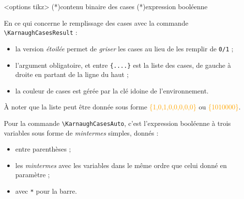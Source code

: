\documentclass[french,a4paper,11pt]{article}
\newcommand\Cle[1]{{\small\sffamily\textlangle \textcolor{orange}{#1}\textrangle}}
\begin{document}
{{\begin{DemoCode}
\begin{TableKarnaugh}[clés]<options tikz>
	\KarnaughCasesResult(*){contenu binaire des cases}
	\KarnaughCasesAuto(*){expression booléenne}
\end{TableKarnaugh}
\end{DemoCode}

\begin{tipblock}
En ce qui concerne le remplissage des cases avec la commande \texttt{\textbackslash KarnaughCasesResult} :

\begin{itemize}
	\item la version \textit{étoilée} permet de \textit{griser} les cases au lieu de les remplir de \texttt{0/1} ;
	\item l'argument obligatoire, et entre \texttt{\{....\}} est la liste des cases, de gauche à droite en partant de la ligne du haut ;
	\item la couleur de cases est gérée par la clé idoine de l'environnement.
\end{itemize}

À noter que la liste peut être donnée sous forme \Cle{\{1,0,1,0,0,0,0,0\}} ou \Cle{\{1010000\}}.
\end{tipblock}

\begin{tipblock}
Pour la commande \texttt{\textbackslash KarnaughCasesAuto}, c'est l'expression booléenne à trois variables sous forme de \textit{mintermes} simples, donnés :
%
\begin{itemize}
	\item entre parenthèses ;
	\item les \textit{mintermes} avec les variables dans le même ordre que celui donné en paramètre ;
	\item avec \texttt{*} pour la barre.
\end{itemize}
\vspace*{-\baselineskip}\leavevmode
\end{tipblock}

\begin{DemoCode}[]
\begin{TableKarnaugh}
\end{TableKarnaugh}
\begin{TableKarnaugh}[Swap]
\end{TableKarnaugh}


\end{DemoCode}}}
\end{document}
